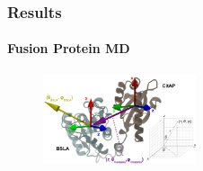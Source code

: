 \documentclass[english]{beamer}
\begin{document}

\begin{frame}
    \frametitle{Results}
\framesubtitle{Fusion Protein MD}%

    \vspace{0.94\topmargin}

    \begin{figure}
        \hspace{0.0\textwidth}
        \includegraphics[width=0.40\textwidth]{figures/Collective_coords/collective_coords.pdf}
    \end{figure}     

    \vspace{-0.5cm}
 


\end{frame}
\end{document}
